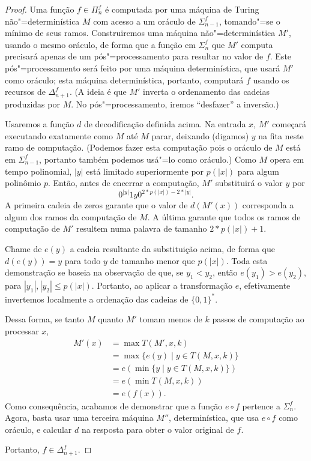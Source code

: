 \begin{proof}
    Uma função $f \in \Pi_n^f$
    é computada por uma máquina de Turing não"=determinística $M$
    com acesso a um oráculo de $\Sigma_{n-1}^f$,
    tomando"=se o mínimo de seus ramos.
    Construiremos uma máquina não"=determinística $M'$,
    usando o mesmo oráculo,
    de forma que a função em $\Sigma_n^f$ que $M'$ computa
    precisará apenas de um pós"=processamento
    para resultar no valor de $f$.
    Este pós"=processamento será feito por uma máquina determinística,
    que usará $M'$ como oráculo;
    esta máquina determinística,
    portanto, computará $f$ usando os recursos de $\Delta_{n+1}^f$.
    (A ideia é que $M'$ inverta o ordenamento das cadeias
    produzidas por $M$.
    No pós"=processamento, iremos ``desfazer'' a inversão.)

    Usaremos a função $d$ de decodificação definida acima.
    Na entrada $x$, $M'$ começará executando exatamente como $M$
    até $M$ parar, deixando (digamos) $y$ na fita neste ramo de computação.
    (Podemos fazer esta computação pois o oráculo de $M$
    está em $\Sigma_{n-1}^f$,
    portanto também podemos usá"=lo como oráculo.)
    Como $M$ opera em tempo polinomial,
    $|y|$ está limitado superiormente por $p(|x|)$ para algum polinômio $p$.
    Então,
    antes de encerrar a computação,
    $M'$ substituirá o valor $y$ por
    \begin{equation*}
        0^{|y|}1 y 0^{2*p(|x|) - 2*|y|}.
    \end{equation*}
    A primeira cadeia de zeros garante que o valor de $d(M'(x))$
    corresponda a algum dos ramos da computação de $M$.
    A última garante que todos os ramos de computação de $M'$
    resultem numa palavra de tamanho $2*p(|x|)+1$.

    Chame de $e(y)$ a cadeia resultante da substituição acima,
    de forma que $d(e(y)) = y$
    para todo $y$ de tamanho menor que $p(|x|)$.
    Toda esta demonstração se baseia na observação de que,
    se $y_1 < y_2$, então $e(y_1) > e(y_2)$,
    para $|y_1|, |y_2| \leq p(|x|)$.
    Portanto,
    ao aplicar a transformação $e$,
    efetivamente invertemos localmente a ordenação das cadeias de $\{0, 1\}^*$.

    Dessa forma, se tanto $M$ quanto $M'$ tomam menos de $k$ passos de computação
    ao processar $x$,
    \begin{align*}
        M'(x) &= \max T(M', x, k) \\
              &= \max \{e(y) \mid y \in T(M, x, k) \} \\
              &= e \left( \min \{y \mid y \in T(M, x, k) \} \right) \\
              &= e \left( \min T(M, x, k) \right) \\
              &= e( f(x) ).
    \end{align*}
    Como consequência,
    acabamos de demonstrar que a função $e \circ f$ pertence a $\Sigma_n^f$.
    Agora,
    basta usar uma terceira máquina $M''$,
    determinística,
    que usa $e \circ f$ como oráculo,
    e calcular $d$ na resposta para obter o valor original de $f$.

    Portanto, $f \in \Delta_{n+1}^f$.
\end{proof}

